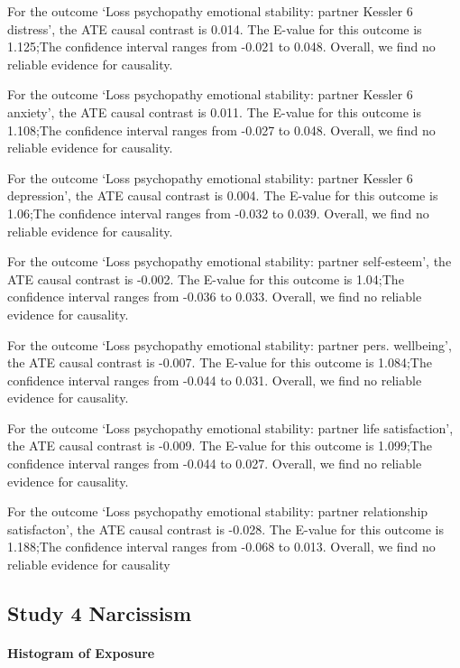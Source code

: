 \documentclass[
  singlecolumn]{article}
\let\oldparagraph\paragraph
\renewcommand{\paragraph}[1]{\oldparagraph{#1}\mbox{}}
\begin{document}
For the outcome `Loss psychopathy emotional stability: partner Kessler 6
distress', the ATE causal contrast is 0.014. The E-value for this
outcome is 1.125;The confidence interval ranges from -0.021 to 0.048.
Overall, we find no reliable evidence for causality.

For the outcome `Loss psychopathy emotional stability: partner Kessler 6
anxiety', the ATE causal contrast is 0.011. The E-value for this outcome
is 1.108;The confidence interval ranges from -0.027 to 0.048. Overall,
we find no reliable evidence for causality.

For the outcome `Loss psychopathy emotional stability: partner Kessler 6
depression', the ATE causal contrast is 0.004. The E-value for this
outcome is 1.06;The confidence interval ranges from -0.032 to 0.039.
Overall, we find no reliable evidence for causality.

For the outcome `Loss psychopathy emotional stability: partner
self-esteem', the ATE causal contrast is -0.002. The E-value for this
outcome is 1.04;The confidence interval ranges from -0.036 to 0.033.
Overall, we find no reliable evidence for causality.

For the outcome `Loss psychopathy emotional stability: partner pers.
wellbeing', the ATE causal contrast is -0.007. The E-value for this
outcome is 1.084;The confidence interval ranges from -0.044 to 0.031.
Overall, we find no reliable evidence for causality.

For the outcome `Loss psychopathy emotional stability: partner life
satisfaction', the ATE causal contrast is -0.009. The E-value for this
outcome is 1.099;The confidence interval ranges from -0.044 to 0.027.
Overall, we find no reliable evidence for causality.

For the outcome `Loss psychopathy emotional stability: partner
relationship satisfacton', the ATE causal contrast is -0.028. The
E-value for this outcome is 1.188;The confidence interval ranges from
-0.068 to 0.013. Overall, we find no reliable evidence for causality

\subsection{Study 4 Narcissism}\label{study-4-narcissism}

\paragraph{Histogram of Exposure}\label{histogram-of-exposure-3}
\end{document}
